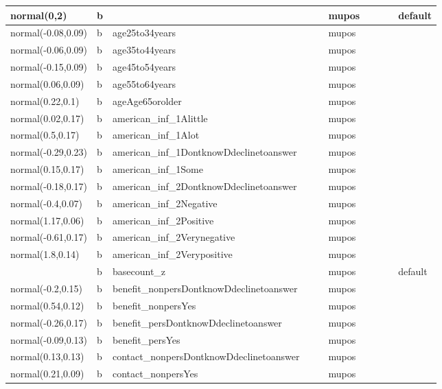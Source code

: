 \documentclass[
]{book}
\theoremstyle{definition}
\theoremstyle{definition}
\theoremstyle{definition}
\theoremstyle{definition}
\theoremstyle{remark}
\begin{document}
\begin{table}
\begin{tabular}[t]{l|l|l|l|l|l|l|l|l|l}
\hline
normal(0,2) & b &  &  &  & mupos &  &  &  & default\\
\hline
normal(-0.08,0.09) & b & age25to34years &  &  & mupos &  &  &  & \\
\hline
normal(-0.06,0.09) & b & age35to44years &  &  & mupos &  &  &  & \\
\hline
normal(-0.15,0.09) & b & age45to54years &  &  & mupos &  &  &  & \\
\hline
normal(0.06,0.09) & b & age55to64years &  &  & mupos &  &  &  & \\
\hline
normal(0.22,0.1) & b & ageAge65orolder &  &  & mupos &  &  &  & \\
\hline
normal(0.02,0.17) & b & american\_inf\_1Alittle &  &  & mupos &  &  &  & \\
\hline
normal(0.5,0.17) & b & american\_inf\_1Alot &  &  & mupos &  &  &  & \\
\hline
normal(-0.29,0.23) & b & american\_inf\_1DontknowDdeclinetoanswer &  &  & mupos &  &  &  & \\
\hline
normal(0.15,0.17) & b & american\_inf\_1Some &  &  & mupos &  &  &  & \\
\hline
normal(-0.18,0.17) & b & american\_inf\_2DontknowDdeclinetoanswer &  &  & mupos &  &  &  & \\
\hline
normal(-0.4,0.07) & b & american\_inf\_2Negative &  &  & mupos &  &  &  & \\
\hline
normal(1.17,0.06) & b & american\_inf\_2Positive &  &  & mupos &  &  &  & \\
\hline
normal(-0.61,0.17) & b & american\_inf\_2Verynegative &  &  & mupos &  &  &  & \\
\hline
normal(1.8,0.14) & b & american\_inf\_2Verypositive &  &  & mupos &  &  &  & \\
\hline
 & b & basecount\_z &  &  & mupos &  &  &  & default\\
\hline
normal(-0.2,0.15) & b & benefit\_nonpersDontknowDdeclinetoanswer &  &  & mupos &  &  &  & \\
\hline
normal(0.54,0.12) & b & benefit\_nonpersYes &  &  & mupos &  &  &  & \\
\hline
normal(-0.26,0.17) & b & benefit\_persDontknowDdeclinetoanswer &  &  & mupos &  &  &  & \\
\hline
normal(-0.09,0.13) & b & benefit\_persYes &  &  & mupos &  &  &  & \\
\hline
normal(0.13,0.13) & b & contact\_nonpersDontknowDdeclinetoanswer &  &  & mupos &  &  &  & \\
\hline
normal(0.21,0.09) & b & contact\_nonpersYes &  &  & mupos &  &  &  & \\

\end{tabular}
\end{table}
\end{document}
